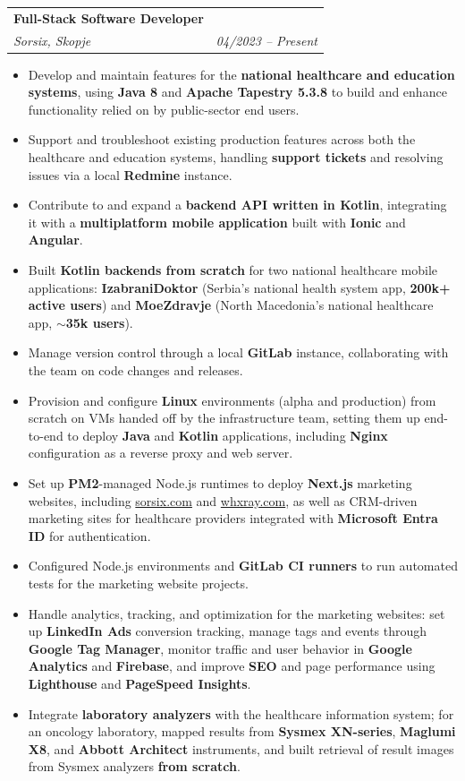 \documentclass[letterpaper,11pt]{article}
\makeatletter
\newcommand{\resumeItem}[1]{
  \item\small{
    {#1 \vspace{-2pt}}
  }
}
\newcommand{\resumeSubheading}[4]{
  \vspace{-2pt}\item
    \begin{tabular*}{0.97\textwidth}[t]{l@{\extracolsep{\fill}}r}
      \textbf{#1} & #2 \\
      \textit{\small#3} & \textit{\small #4} \\
    \end{tabular*}\vspace{-7pt}
}
\newcommand{\resumeItemListStart}{\begin{itemize}[leftmargin=0.2in, itemsep=1pt]}
\newcommand{\resumeItemListEnd}{\end{itemize}\vspace{-5pt}}
\makeatother
\begin{document}
    \resumeSubheading
      {Full-Stack Software Developer}{}
      {Sorsix, Skopje}{04/2023 -- Present}
      \resumeItemListStart
        \resumeItem{Develop and maintain features for the \textbf{national healthcare and education systems}, using \textbf{Java 8} and \textbf{Apache Tapestry 5.3.8} to build and enhance functionality relied on by public-sector end users.}
        \resumeItem{Support and troubleshoot existing production features across both the healthcare and education systems, handling \textbf{support tickets} and resolving issues via a local \textbf{Redmine} instance.}
        \resumeItem{Contribute to and expand a \textbf{backend API written in Kotlin}, integrating it with a \textbf{multiplatform mobile application} built with \textbf{Ionic} and \textbf{Angular}.}
        \resumeItem{Built \textbf{Kotlin backends from scratch} for two national healthcare mobile applications: \textbf{IzabraniDoktor} (Serbia's national health system app, \textbf{200k+ active users}) and \textbf{MoeZdravje} (North Macedonia's national healthcare app, \textbf{$\sim$35k users}).}
        \resumeItem{Manage version control through a local \textbf{GitLab} instance, collaborating with the team on code changes and releases.}
        \resumeItem{Provision and configure \textbf{Linux} environments (alpha and production) from scratch on VMs handed off by the infrastructure team, setting them up end-to-end to deploy \textbf{Java} and \textbf{Kotlin} applications, including \textbf{Nginx} configuration as a reverse proxy and web server.}
        \resumeItem{Set up \textbf{PM2}-managed Node.js runtimes to deploy \textbf{Next.js} marketing websites, including \href{https://www.sorsix.com}{sorsix.com} and \href{https://whxray.com}{whxray.com}, as well as CRM-driven marketing sites for healthcare providers integrated with \textbf{Microsoft Entra ID} for authentication.}
        \resumeItem{Configured Node.js environments and \textbf{GitLab CI runners} to run automated tests for the marketing website projects.}
        \resumeItem{Handle analytics, tracking, and optimization for the marketing websites: set up \textbf{LinkedIn Ads} conversion tracking, manage tags and events through \textbf{Google Tag Manager}, monitor traffic and user behavior in \textbf{Google Analytics} and \textbf{Firebase}, and improve \textbf{SEO} and page performance using \textbf{Lighthouse} and \textbf{PageSpeed Insights}.}
        \resumeItem{Integrate \textbf{laboratory analyzers} with the healthcare information system; for an oncology laboratory, mapped results from \textbf{Sysmex XN-series}, \textbf{Maglumi X8}, and \textbf{Abbott Architect} instruments, and built retrieval of result images from Sysmex analyzers \textbf{from scratch}.}
      \resumeItemListEnd
\end{document}
